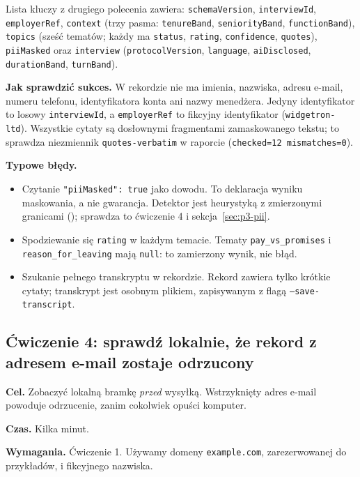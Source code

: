 {Lista kluczy z drugiego polecenia zawiera: \texttt{schemaVersion},
\texttt{interviewId}, \texttt{employerRef}, \texttt{context} (trzy pasma:
\texttt{tenureBand}, \texttt{seniorityBand}, \texttt{functionBand}), \texttt{topics}
(sześć tematów; każdy ma \texttt{status}, \texttt{rating}, \texttt{confidence},
\texttt{quotes}), \texttt{piiMasked} oraz \texttt{interview} (\texttt{protocolVersion},
\texttt{language}, \texttt{aiDisclosed}, \texttt{durationBand}, \texttt{turnBand}).

\textbf{Jak sprawdzić sukces.} W rekordzie nie ma imienia, nazwiska, adresu
e-mail, numeru telefonu, identyfikatora konta ani nazwy menedżera. Jedyny
identyfikator to losowy \texttt{interviewId}, a \texttt{employerRef} to fikcyjny
identyfikator (\texttt{widgetron-ltd}). Wszystkie cytaty są dosłownymi fragmentami
zamaskowanego tekstu; to sprawdza niezmiennik \texttt{quotes-verbatim} w raporcie
(\texttt{checked=12 mismatches=0}).

\textbf{Typowe błędy.}
\begin{itemize}[leftmargin=*,itemsep=1pt]
  \item Czytanie \texttt{"piiMasked": true} jako dowodu. To deklaracja wyniku
        maskowania, a nie gwarancja. Detektor jest heurystyką z zmierzonymi granicami
        (); sprawdza to ćwiczenie 4 i sekcja~\ref{sec:p3-pii}.
  \item Spodziewanie się \texttt{rating} w każdym temacie. Tematy \texttt{pay\_vs\_promises}
        i \texttt{reason\_for\_leaving} mają \texttt{null}: to zamierzony wynik, nie błąd.
  \item Szukanie pełnego transkryptu w rekordzie. Rekord zawiera tylko krótkie
        cytaty; transkrypt jest osobnym plikiem, zapisywanym z flagą \texttt{--save-transcript}.
\end{itemize}

\subsection{Ćwiczenie 4: sprawdź lokalnie, że rekord z adresem e-mail zostaje odrzucony}

\textbf{Cel.} Zobaczyć lokalną bramkę \emph{przed} wysyłką. Wstrzyknięty adres
e-mail powoduje odrzucenie, zanim cokolwiek opuści komputer.

\textbf{Czas.} Kilka minut.

\textbf{Wymagania.} Ćwiczenie 1. Używamy domeny \texttt{example.com}, zarezerwowanej
do przykładów, i fikcyjnego nazwiska.

}
